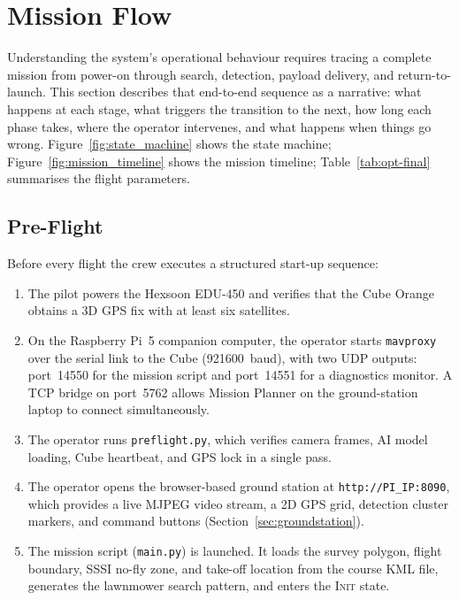 \section{Mission Flow}\label{sec:mission-flow}

Understanding the system's operational behaviour requires tracing a complete mission from power-on through search, detection, payload delivery, and return-to-launch.  This section describes that end-to-end sequence as a narrative: what happens at each stage, what triggers the transition to the next, how long each phase takes, where the operator intervenes, and what happens when things go wrong.  Figure~\ref{fig:state_machine} shows the state machine; Figure~\ref{fig:mission_timeline} shows the mission timeline; Table~\ref{tab:opt-final} summarises the flight parameters.

\subsection{Pre-Flight}\label{sec:mf-preflight}

Before every flight the crew executes a structured start-up sequence:

\begin{enumerate}
  \item The pilot powers the Hexsoon EDU-450 and verifies that the Cube Orange obtains a 3D GPS fix with at least six satellites.
  \item On the Raspberry Pi~5 companion computer, the operator starts \texttt{mavproxy} over the serial link to the Cube (\SI{921600}{baud}), with two UDP outputs: port~14550 for the mission script and port~14551 for a diagnostics monitor. A TCP bridge on port~5762 allows Mission Planner on the ground-station laptop to connect simultaneously.
  \item The operator runs \texttt{preflight.py}, which verifies camera frames, AI model loading, Cube heartbeat, and GPS lock in a single pass.
  \item The operator opens the browser-based ground station at \texttt{http://PI\_IP:8090}, which provides a live MJPEG video stream, a 2D GPS grid, detection cluster markers, and command buttons (Section~\ref{sec:groundstation}).
  \item The mission script (\texttt{main.py}) is launched. It loads the survey polygon, flight boundary, SSSI no-fly zone, and take-off location from the course KML file, generates the lawnmower search pattern, and enters the \textsc{Init} state.
\end{enumerate}

